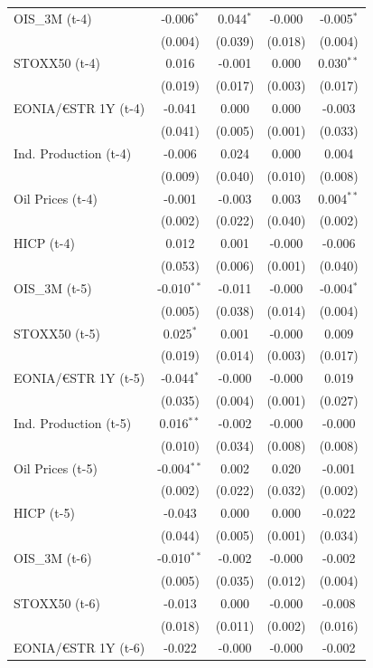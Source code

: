 \begin{longtable}[t]{lcccc}
OIS\_3M (t-4) & -0.006$^{*}$ & 0.044$^{*}$ & -0.000 & -0.005$^{*}$\\
 & (0.004) & (0.039) & (0.018) & (0.004)\\
STOXX50 (t-4) & 0.016 & -0.001 & 0.000 & 0.030$^{**}$\\
 & (0.019) & (0.017) & (0.003) & (0.017)\\
EONIA/€STR 1Y (t-4) & -0.041 & 0.000 & 0.000 & -0.003\\
 & (0.041) & (0.005) & (0.001) & (0.033)\\
Ind. Production (t-4) & -0.006 & 0.024 & 0.000 & 0.004\\
 & (0.009) & (0.040) & (0.010) & (0.008)\\
Oil Prices (t-4) & -0.001 & -0.003 & 0.003 & 0.004$^{**}$\\
 & (0.002) & (0.022) & (0.040) & (0.002)\\
HICP (t-4) & 0.012 & 0.001 & -0.000 & -0.006\\
 & (0.053) & (0.006) & (0.001) & (0.040)\\
OIS\_3M (t-5) & -0.010$^{**}$ & -0.011 & -0.000 & -0.004$^{*}$\\
 & (0.005) & (0.038) & (0.014) & (0.004)\\
STOXX50 (t-5) & 0.025$^{*}$ & 0.001 & -0.000 & 0.009\\
 & (0.019) & (0.014) & (0.003) & (0.017)\\
EONIA/€STR 1Y (t-5) & -0.044$^{*}$ & -0.000 & -0.000 & 0.019\\
 & (0.035) & (0.004) & (0.001) & (0.027)\\
Ind. Production (t-5) & 0.016$^{**}$ & -0.002 & -0.000 & -0.000\\
 & (0.010) & (0.034) & (0.008) & (0.008)\\
Oil Prices (t-5) & -0.004$^{**}$ & 0.002 & 0.020 & -0.001\\
 & (0.002) & (0.022) & (0.032) & (0.002)\\
HICP (t-5) & -0.043 & 0.000 & 0.000 & -0.022\\
 & (0.044) & (0.005) & (0.001) & (0.034)\\
OIS\_3M (t-6) & -0.010$^{**}$ & -0.002 & -0.000 & -0.002\\
 & (0.005) & (0.035) & (0.012) & (0.004)\\
STOXX50 (t-6) & -0.013 & 0.000 & -0.000 & -0.008\\
 & (0.018) & (0.011) & (0.002) & (0.016)\\
EONIA/€STR 1Y (t-6) & -0.022 & -0.000 & -0.000 & -0.002\\

\end{longtable}
